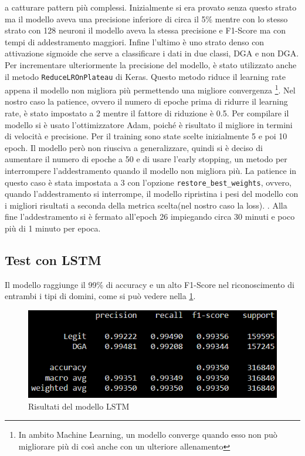 \documentclass[12pt,a4paper,openright,twoside]{book}
\begin{document}
a catturare pattern più complessi. Inizialmente
si era provato senza questo strato ma 
il modello aveva una precisione inferiore di circa il 5\% mentre con lo stesso
strato con 128 neuroni il modello aveva la stessa precisione e F1-Score ma con tempi
di addestramento maggiori. Infine
l'ultimo è uno strato denso con attivazione sigmoide
che serve a classificare i dati in due classi, DGA e non DGA.
Per incrementare ulteriormente la precisione del modello,
è stato utilizzato anche il metodo \texttt{ReduceLROnPlateau} di Keras.
Questo metodo riduce il learning rate appena il modello non migliora più
permettendo una migliore convergenza \footnote{In ambito Machine Learning, un modello converge quando esso non può migliorare più di così anche con un ulteriore allenamento\cite{convergence}}. Nel nostro caso
la patience, ovvero il numero di epoche prima di ridurre il learning rate,
è stato impostato a 2 mentre il fattore di riduzione è 0.5.
Per compilare il modello si è usato l'ottimizzatore Adam,
poiché è risultato il migliore in termini di velocità e precisione.
Per il training sono state scelte inizialmente 5 e poi 10 epoch.
Il modello però non riusciva a generalizzare, quindi si è deciso di aumentare
il numero di epoche a 50 e di usare l'early stopping, un metodo per interrompere
l'addestramento quando il modello non migliora più. La patience in questo
caso è stata impostata a 3 con l'opzione \texttt{restore\_best\_weights}, ovvero, quando l'addestramento si interrompe,
il modello ripristina i pesi del modello con i migliori risultati a seconda della metrica scelta(nel nostro caso la loss).
. Alla
fine l'addestramento si è fermato all'epoch 26 impiegando circa 30 minuti e poco più di 1 minuto per epoca.

\subsection{Test con LSTM}
Il modello raggiunge il 99\% di accuracy e un alto F1-Score nel riconoscimento di entrambi i tipi di domini,
come si può vedere nella \cref{fig:LSTM results}.

\begin{figure}[h]
    \centering
    \includegraphics[width=.8\linewidth]{figures/LSTM_results.png}
    \caption{Risultati del modello LSTM}
    \label{fig:LSTM results}
\end{figure}
\end{document}

